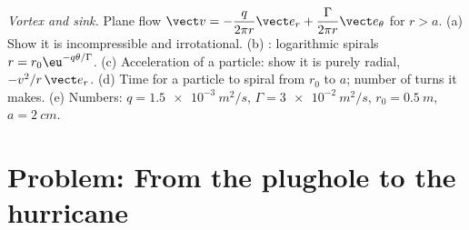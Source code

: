 \begin{exercise}[$\star\star\star$]\label{exo:b2:fluid-kinematics:12}
\emph{Vortex and sink.} Plane flow $\vect v = -\dfrac{q}{2\pi r}\vect e_r +
\dfrac{\Gamma}{2\pi r}\vect e_\theta$ for $r > a$. (a) Show it is
incompressible and irrotational. (b) : logarithmic spirals
$r = r_0\eu^{-q\theta/\Gamma}$. (c) Acceleration of a particle: show it is
purely radial, $-v^2/r\,\vect e_r$. (d) Time for a particle to spiral
from $r_0$ to $a$; number of turns it makes. (e) Numbers: $q =
\qty{1.5e-3}{m^2/s}$, $\Gamma = \qty{3e-2}{m^2/s}$, $r_0 = \qty{0.5}{m}$,
$a = \qty{2}{cm}$.
\end{exercise}

\section{Problem: From the plughole to the hurricane}


